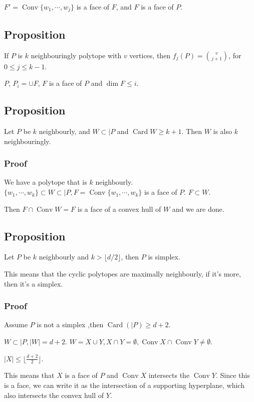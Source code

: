 \documentclass[11pt]{article}
\def\conv{\operatorname{Conv}}
\def\card{\operatorname{Card}}
\begin{document}
{{\(F' = \conv \{w_1, \cdots, w_j\}\) is a face of \(F\), and \(F\) is a face of
\(P\).
\subsection{Proposition}
\label{sec:orgbc3a394}
If \(P\) is \(k\) neighbouringly polytope with \(v\) vertices, then \(f_j(P) =
   \binom{v}{j+1}\), for \(0 \le j \le k - 1\).

\(P\), \(P_i = \cup F\), \(F\) is a face of \(P\) and \(\dim F \le i\).
\subsection{Proposition}
\label{sec:org1b6da69}
Let \(P\) be \(k\) neighbourly, and \(W \subset \vert P\) and \(\card W \ge k + 1\).
Then \(W\) is also \(k\) neighbouringly.
\subsubsection{Proof}
\label{sec:org2d95031}
We have a polytope that is \(k\) neighbourly. \(\{w_1, \cdots, w_k \} \subset W
    \subset \vert P, F = \conv \{w_1, \cdots, w_k\}\) is a face of \(P\). \(F
    \subset W\).

Then \(F \cap \conv W = F\) is a face of a convex hull of \(W\) and we are done.
\subsection{Proposition}
\label{sec:org793f145}
Let \(P\) be \(k\) neighbourly and \(k > \lfloor d/2 \rfloor\), then \(P\) is simplex.

This means that the cyclic polytopes are maximally neighbourly, if it's more,
then it's a simplex.
\subsubsection{Proof}
\label{sec:orgbbcd65b}
Assume \(P\) is not a simplex ,then \(\card (\vert P ) \ge d + 2\).

\(W \subset \vert P, \vert W \vert = d + 2\). \(W = X \cup Y, X \cap Y =
    \emptyset, \conv X \cap \conv Y \neq \emptyset\).

\(\vert X \vert \le \lfloor \frac{d + 2}{2}\rfloor\).

This means that \(X\) is a face of \(P\) and \(\conv X\) intersects the \(\conv Y\).
Since this is a face, we can write it as the intersection of a supporting
hyperplane, which also intersects the convex hull of \(Y\).

}}
\end{document}
